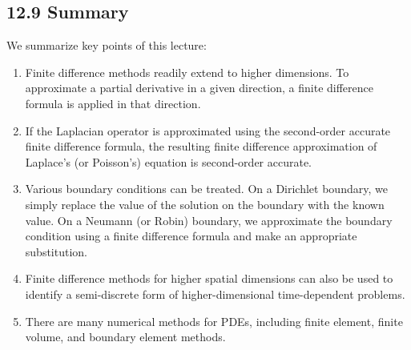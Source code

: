 \subsection{12.9 Summary}
We summarize key points of this lecture:
\begin{enumerate}
    \item Finite difference methods readily extend to higher dimensions. To approximate a partial derivative in a given direction, a finite difference formula is applied in that direction.
    \item If the Laplacian operator is approximated using the second-order accurate finite difference formula, the resulting finite difference approximation of Laplace's (or Poisson's) equation is second-order accurate.
    \item Various boundary conditions can be treated. On a Dirichlet boundary, we simply replace the value of the solution on the boundary with the known value. On a Neumann (or Robin) boundary, we approximate the boundary condition using a finite difference formula and make an appropriate substitution.
    \item Finite difference methods for higher spatial dimensions can also be used to identify a semi-discrete form of higher-dimensional time-dependent problems.
    \item There are many numerical methods for PDEs, including finite element, finite volume, and boundary element methods.
\end{enumerate}
